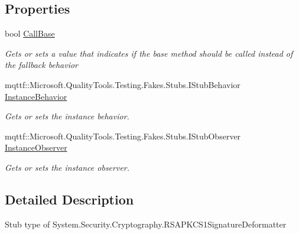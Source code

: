 \subsection*{Properties}
\begin{DoxyCompactItemize}
\item 
bool \hyperlink{class_system_1_1_security_1_1_cryptography_1_1_fakes_1_1_stub_r_s_a_p_k_c_s1_signature_deformatter_ac7021eb451e2d21962c2d455b34f4f6f}{Call\-Base}
\begin{DoxyCompactList}\small\item\em Gets or sets a value that indicates if the base method should be called instead of the fallback behavior\end{DoxyCompactList}\item 
mqttf\-::\-Microsoft.\-Quality\-Tools.\-Testing.\-Fakes.\-Stubs.\-I\-Stub\-Behavior \hyperlink{class_system_1_1_security_1_1_cryptography_1_1_fakes_1_1_stub_r_s_a_p_k_c_s1_signature_deformatter_af11f53cd21d69a39cee29da33c65d7f0}{Instance\-Behavior}
\begin{DoxyCompactList}\small\item\em Gets or sets the instance behavior.\end{DoxyCompactList}\item 
mqttf\-::\-Microsoft.\-Quality\-Tools.\-Testing.\-Fakes.\-Stubs.\-I\-Stub\-Observer \hyperlink{class_system_1_1_security_1_1_cryptography_1_1_fakes_1_1_stub_r_s_a_p_k_c_s1_signature_deformatter_a88728df211080650b634a1357ee8e88b}{Instance\-Observer}
\begin{DoxyCompactList}\small\item\em Gets or sets the instance observer.\end{DoxyCompactList}\end{DoxyCompactItemize}


\subsection{Detailed Description}
Stub type of System.\-Security.\-Cryptography.\-R\-S\-A\-P\-K\-C\-S1\-Signature\-Deformatter




